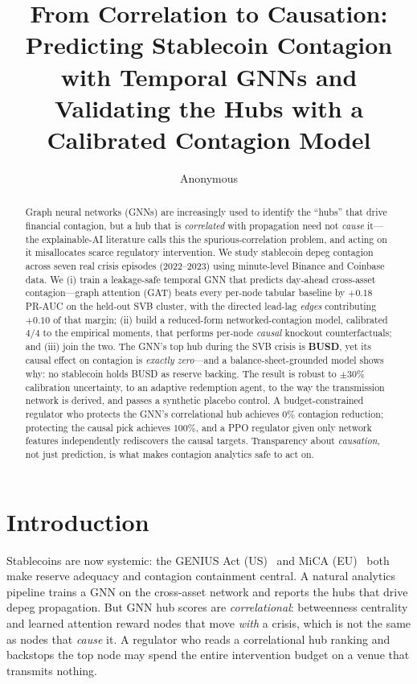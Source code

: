 \documentclass[sigconf,nonacm]{acmart}
\begin{document}
\title{From Correlation to Causation: Predicting Stablecoin Contagion with
Temporal GNNs and Validating the Hubs with a Calibrated Contagion Model}

\author{Anonymous}

\begin{abstract}
Graph neural networks (GNNs) are increasingly used to identify the ``hubs'' that drive
financial contagion, but a hub that is \emph{correlated} with propagation need not
\emph{cause} it---the explainable-AI literature calls this the spurious-correlation problem,
and acting on it misallocates scarce regulatory intervention. We study stablecoin depeg
contagion across seven real crisis episodes (2022--2023) using minute-level Binance and
Coinbase data. We (i) train a leakage-safe temporal GNN that predicts day-ahead cross-asset
contagion---graph attention (GAT) beats every per-node tabular baseline by $+0.18$ PR-AUC on
the held-out SVB cluster, with the directed lead-lag \emph{edges} contributing $+0.10$ of that
margin; (ii) build a reduced-form networked-contagion model, calibrated $4/4$ to the empirical
moments, that performs per-node \emph{causal} knockout counterfactuals; and (iii) join the two.
The GNN's top hub during the SVB crisis is \textbf{BUSD}, yet its causal effect on contagion is
\emph{exactly zero}---and a balance-sheet-grounded model shows why: no stablecoin holds BUSD as
reserve backing. The result is robust to $\pm 30\%$ calibration uncertainty, to an adaptive
redemption agent, to the way the transmission network is derived, and passes a synthetic
placebo control. A budget-constrained regulator who protects the GNN's correlational hub
achieves $0\%$ contagion reduction; protecting the causal pick achieves $100\%$, and a PPO
regulator given only network features independently rediscovers the causal targets. Transparency
about \emph{causation}, not just prediction, is what makes contagion analytics safe to act on.
\end{abstract}


\maketitle

\section{Introduction}
Stablecoins are now systemic: the GENIUS Act (US)~\cite{genius2025} and MiCA (EU)~\cite{mica2023}
both make reserve adequacy and
contagion containment central. A natural analytics pipeline trains a GNN on the cross-asset
network and reports the hubs that drive depeg propagation. But GNN hub scores are
\emph{correlational}: betweenness centrality and learned attention reward nodes that move
\emph{with} a crisis, which is not the same as nodes that \emph{cause} it. A regulator who reads
a correlational hub ranking and backstops the top node may spend the entire intervention budget
on a venue that transmits nothing.
\end{document}
